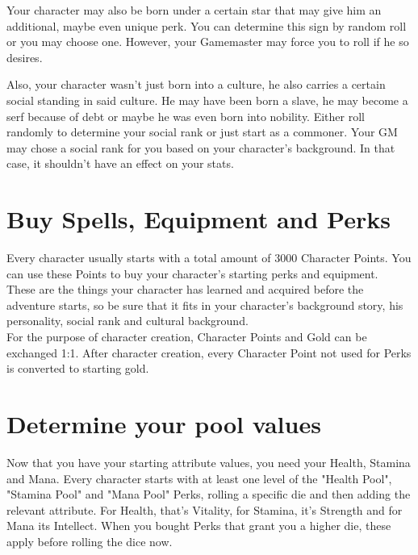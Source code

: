 Your character may also be born under a certain star that may give him an additional, maybe even unique perk. You can determine this sign by random roll or you may choose one. However, your Gamemaster may force you to roll if he so desires.

Also, your character wasn’t just born into a culture, he also carries a certain social standing in said culture. He may have been born a slave, he may become a serf because of debt or maybe he was even born into nobility. Either roll randomly to determine your social rank or just start as a commoner. Your GM may chose a social rank for you based on your character's background. In that case, it shouldn't have an effect on your stats.



\section{Buy Spells, Equipment and Perks}

Every character usually starts with a total amount of 3000 Character Points. You can use these Points to buy your character’s starting perks and equipment.\\
These are the things your character has learned and acquired before the adventure starts, so be sure that it fits in your character’s background story, his personality, social rank and cultural background.\\
For the purpose of character creation, Character Points and Gold can be exchanged 1:1. After character creation, every Character Point not used for Perks is converted to starting gold.\\



\section{Determine your pool values}

Now that you have your starting attribute values, you need your Health, Stamina and Mana. Every character starts with at least one level of the "Health Pool", "Stamina Pool" and "Mana Pool" Perks, rolling a specific die and then adding the relevant attribute. For Health, that’s Vitality, for Stamina, it’s Strength and for Mana its Intellect. When you bought Perks that grant you a higher die, these apply before rolling the dice now.